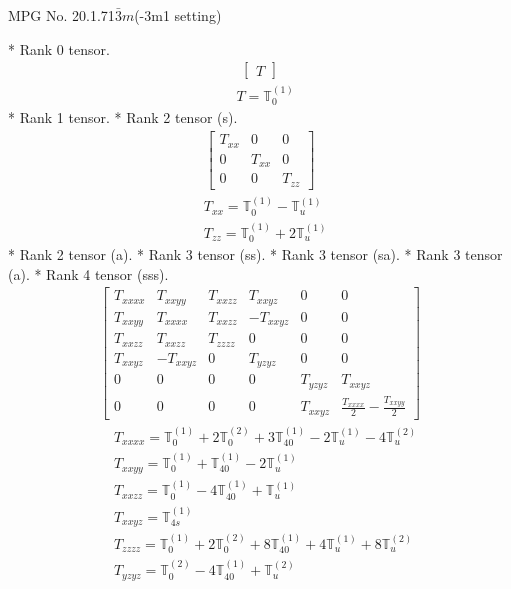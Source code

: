 \documentclass[fleqn,8pt,landscape]{jsarticle}
\begin{document}
\setcounter{MaxMatrixCols}{32}

\renewcommand{\tablename}{Table~}
\renewcommand{\figurename}{Figure~}
\begin{center}
\LARGE
MPG No. 20.1.71\quad$\bar{3}m$\quad(-3m1 setting)
\end{center}
* Rank 0 tensor.
\begin{align*}
\begin{bmatrix} T \end{bmatrix}
\end{align*}
\begin{align*}
& T = \mathbb{T}_{0}^{(1)}
\end{align*}
* Rank 1 tensor.
* Rank 2 tensor (s).
\begin{align*}
\begin{bmatrix} T_{xx} & 0 & 0 \\ 0 & T_{xx} & 0 \\ 0 & 0 & T_{zz} \end{bmatrix}
\end{align*}
\begin{align*}
& T_{xx} = \mathbb{T}_{0}^{(1)} - \mathbb{T}_{u}^{(1)} \\
& T_{zz} = \mathbb{T}_{0}^{(1)} + 2 \mathbb{T}_{u}^{(1)}
\end{align*}
* Rank 2 tensor (a).
* Rank 3 tensor (ss).
* Rank 3 tensor (sa).
* Rank 3 tensor (a).
* Rank 4 tensor (sss).
\begin{align*}
\begin{bmatrix} T_{xxxx} & T_{xxyy} & T_{xxzz} & T_{xxyz} & 0 & 0 \\ T_{xxyy} & T_{xxxx} & T_{xxzz} & - T_{xxyz} & 0 & 0 \\ T_{xxzz} & T_{xxzz} & T_{zzzz} & 0 & 0 & 0 \\ T_{xxyz} & - T_{xxyz} & 0 & T_{yzyz} & 0 & 0 \\ 0 & 0 & 0 & 0 & T_{yzyz} & T_{xxyz} \\ 0 & 0 & 0 & 0 & T_{xxyz} & \frac{T_{xxxx}}{2} - \frac{T_{xxyy}}{2} \end{bmatrix}
\end{align*}
\begin{align*}
& T_{xxxx} = \mathbb{T}_{0}^{(1)} + 2 \mathbb{T}_{0}^{(2)} + 3 \mathbb{T}_{40}^{(1)} - 2 \mathbb{T}_{u}^{(1)} - 4 \mathbb{T}_{u}^{(2)} \\
& T_{xxyy} = \mathbb{T}_{0}^{(1)} + \mathbb{T}_{40}^{(1)} - 2 \mathbb{T}_{u}^{(1)} \\
& T_{xxzz} = \mathbb{T}_{0}^{(1)} - 4 \mathbb{T}_{40}^{(1)} + \mathbb{T}_{u}^{(1)} \\
& T_{xxyz} = \mathbb{T}_{4s}^{(1)} \\
& T_{zzzz} = \mathbb{T}_{0}^{(1)} + 2 \mathbb{T}_{0}^{(2)} + 8 \mathbb{T}_{40}^{(1)} + 4 \mathbb{T}_{u}^{(1)} + 8 \mathbb{T}_{u}^{(2)} \\
& T_{yzyz} = \mathbb{T}_{0}^{(2)} - 4 \mathbb{T}_{40}^{(1)} + \mathbb{T}_{u}^{(2)}
\end{align*}
\end{document}
